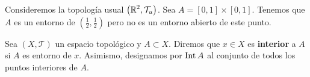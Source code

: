 \begin{eg}
	Consideremos la topología usual $\displaystyle \left(\mathbb{R}^{2}, \mathcal{T}_{u}\right) $. Sea $\displaystyle A = \left[0,1\right] \times\left[0,1\right]  $. Tenemos que $\displaystyle A $ es un entorno de $\displaystyle \left(\frac{1}{2}, \frac{1}{2}\right) $ pero no es un entorno abierto de este punto.
\end{eg}
\begin{definition}
Sea $\displaystyle \left(X, \mathcal{T}\right) $ un espacio topológico y $\displaystyle A \subset X $. Diremos que $\displaystyle x \in X $ es \textbf{interior} a $\displaystyle A $ si $\displaystyle A $ es entorno de $\displaystyle x $. Asimismo, designamos por $\displaystyle \operatorname{Int} A $ al conjunto de todos los puntos interiores de $\displaystyle A $.
\end{definition}

